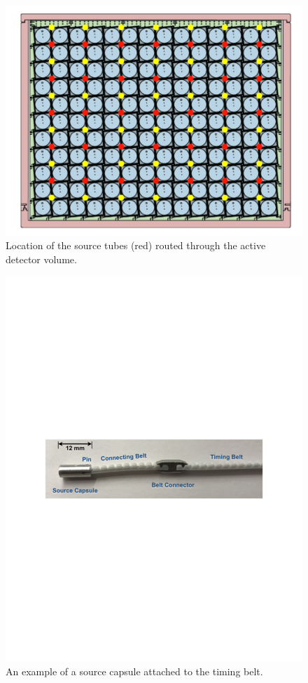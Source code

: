 \begin{figure}[h]
	\centering
	\includegraphics[width=0.7\linewidth]{tex/4-prospect-images/ADCalibrationTubes}
	\caption[Source tube positions]{Location of the source tubes (red) routed through the active detector volume.}
	\label{fig:adcalibrationtubes}
\end{figure}

\begin{figure}[h]
	\centering
	\includegraphics[width=0.7\linewidth]{tex/4-prospect-images/SourceCapsule}
	\caption[Source capsule on timing belt]{An example of a source capsule attached to the timing belt.}
	\label{fig:sourcecapsule}
\end{figure}



